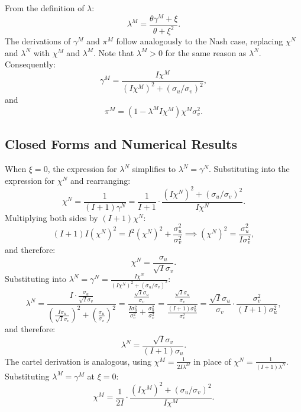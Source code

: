 \documentclass[11pt]{article}
\begin{document}
From the definition of $\lambda$:
\begin{equation}
    \lambda^M=\frac{\theta \gamma^M+\xi}{\theta+\xi^2}.
\end{equation}
The derivations of $\gamma^M$ and $\pi^M$ follow analogously to the Nash case, replacing $\chi^N$ and $\lambda^N$ with $\chi^M$ and $\lambda^M$. Note that $\lambda^M>0$ for the same reason as $\lambda^N$. Consequently:
\begin{equation}
    \gamma^M=\frac{I\chi^M}{(I\chi^M)^2+(\sigma_u/\sigma_v)^2},
\end{equation}
and
\begin{equation}
    \pi^M=(1-\lambda^MI\chi^M)\chi^M\sigma_v^2.
\end{equation}

\subsection{Closed Forms and Numerical Results}
When $\xi=0$, the expression for $\lambda^N$ simplifies to $\lambda^N = \gamma^N$. 
Substituting into the expression for $\chi^N$ and rearranging:
\[
\chi^N = \frac{1}{(I+1)\gamma^N} = \frac{1}{I+1}\cdot\frac{(I\chi^N)^2+(\sigma_u/\sigma_v)^2}{I\chi^N}.
\]
Multiplying both sides by $(I+1)\chi^N$:
\[
(I+1)I(\chi^N)^2 = I^2(\chi^N)^2 + \frac{\sigma_u^2}{\sigma_v^2} \implies (\chi^N)^2 = \frac{\sigma_u^2}{I\sigma_v^2},
\]
and therefore:
\begin{equation}
    \chi^N = \frac{\sigma_u}{\sqrt{I}\sigma_v}.
    \label{nash_chi}
\end{equation}
Substituting into $\lambda^N = \gamma^N = \frac{I\chi^N}{(I\chi^N)^2+(\sigma_u/\sigma_v)^2}$:
\[
\lambda^N = \frac{I\cdot\frac{\sigma_u}{\sqrt{I}\sigma_v}}{\left(\frac{I\sigma_u}{\sqrt{I}\sigma_v}\right)^2+\left(\frac{\sigma_u}{\sigma_v}\right)^2} = \frac{\frac{\sqrt{I}\sigma_u}{\sigma_v}}{\frac{I\sigma_u^2}{\sigma_v^2}+\frac{\sigma_u^2}{\sigma_v^2}} = \frac{\frac{\sqrt{I}\sigma_u}{\sigma_v}}{\frac{(I+1)\sigma_u^2}{\sigma_v^2}} = \frac{\sqrt{I}\sigma_u}{\sigma_v}\cdot\frac{\sigma_v^2}{(I+1)\sigma_u^2},
\]
and therefore:
\begin{equation}
    \lambda^N = \frac{\sqrt{I}\sigma_v}{(I+1)\sigma_u}.
    \label{lambda_N}
\end{equation}
The cartel derivation is analogous, using $\chi^M = \frac{1}{2I\lambda^M}$ in place of 
$\chi^N = \frac{1}{(I+1)\lambda^N}$. Substituting $\lambda^M = \gamma^M$ at $\xi=0$:
\[
\chi^M = \frac{1}{2I}\cdot\frac{(I\chi^M)^2+(\sigma_u/\sigma_v)^2}{I\chi^M}.
\]
\end{document}
